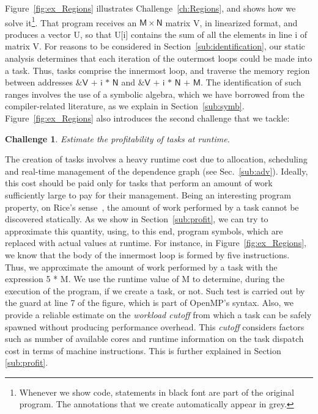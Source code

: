 \documentclass[sigplan,10pt,review,anonymous]{acmart}
\newtheorem{Challenge}{Challenge}[section]
\begin{document}
Figure~\ref{fig:ex_Regions} illustrates Challenge~\ref{ch:Regions}, and shows
how we solve it\footnote{Whenever we show code, statements in black font are part
of the original program.
The annotations that we create automatically appear in grey.}.
That program receives an $\mathsf{M}\times\mathsf{N}$ matrix \textsf{V}, in
linearized format, and produces a vector \textsf{U}, so that \textsf{U[i]}
contains the sum of all the elements in line \textsf{i} of matrix \textsf{V}.
For reasons to be considered in Section~\ref{sub:identification},
our static analysis determines that each iteration of the outermost loops
could be made into a task.
Thus, tasks comprise the innermost loop, and traverse the memory region
between addresses $\textsf{\&V + i * N}$ and $\textsf{\&V + i * N + M}$.
The identification of such ranges involves the use of a symbolic algebra,
which we have borrowed from the compiler-related literature, as we
explain in Section~\ref{sub:symb}.
Figure~\ref{fig:ex_Regions} also introduces the second challenge that we
tackle:

\begin{Challenge}
\label{ch:cost}
Estimate the profitability of tasks at runtime.
\end{Challenge}

The creation of tasks involves a heavy runtime cost due to allocation,
scheduling and real-time management of the dependence graph
(see Sec.~\ref{sub:adv}).
Ideally, this cost should be paid only for tasks that perform an amount of work
sufficiently large to pay for their management.
Being an interesting program property, on Rice's sense~\cite{Rice53}, the amount
of work performed by a task cannot be discovered statically.
As we show in Section~\ref{sub:profit}, we can try to approximate this quantity, using,
to this end, program symbols, which are replaced with actual values at runtime.
For instance, in Figure~\ref{fig:ex_Regions}, we know that the body of the
innermost loop is formed by five instructions.
Thus, we approximate the amount of work performed by a task with the
expression \textsf{5 * M}.
We use the runtime value of \textsf{M} to determine, during the execution of the
program, if we create a task, or not.
Such test is carried out by the guard at line 7 of the figure, which is part of
OpenMP's syntax. Also, we provide a reliable estimate on the \emph{workload cutoff}
from which a task can be safely spawned without producing performance overhead.
This \emph{cutoff} considers factors such as number of available cores
and runtime information on the task dispatch cost in terms of machine
instructions. This is further explained in Section \ref{sub:profit}.
\end{document}

